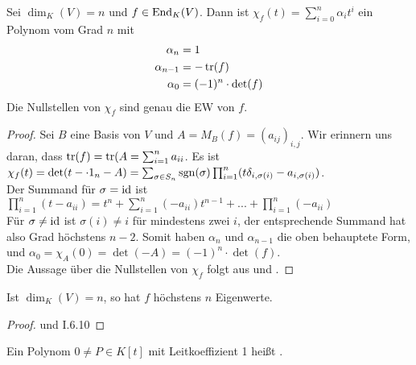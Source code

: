 \begin{proposition}
	Sei $\dim_K(V)=n$ und $f\in\operatorname{End}_K(V)$. Dann ist $\chi_f(t)=\sum_{i=0}^n \alpha_i t^i$ ein Polynom vom Grad $n$ mit 
	\begin{align}
		\alpha_n&=1\notag \\
		\alpha_{n-1}&=-\operatorname{tr}(f) \notag \\
		\alpha_0 &= (-1)^n\cdot\det(f) \notag
	\end{align}
	Die Nullstellen von $\chi_f$ sind genau die EW von $f$.
\end{proposition}
\begin{proof}
	Sei $B$ eine Basis von $V$ und $A=M_B(f)=(a_{ij})_{i,j}$. Wir erinnern uns daran, dass $\operatorname{tr}(f)=\operatorname{tr}(A=\sum_{i=1}^n a_{ii}$. Es ist $\chi_f(t)=\det(t-\cdot 1_n-A)=\sum_{\sigma\in S_n}\operatorname{sgn}(\sigma)\prod_{i=1}^n (t\delta_{i,\sigma(i)}-a_{i,\sigma(i)})$. \\
	Der Summand für \emph{$\sigma=\operatorname{id}$} ist $\prod_{i=1}^n (t-a_{ii})=t^n+\sum_{i=1}^n (-a_{ii})t^{n-1}+...+\prod_{i=1}^n(-a_{ii})$ \\
	Für \emph{$\sigma\neq\operatorname{id}$} ist $\sigma(i)\neq i$ für mindestens zwei $i$, der entsprechende Summand hat also Grad höchstens $n-2$. Somit haben $\alpha_n$ und $\alpha_{n-1}$ die oben behauptete Form, und $\alpha_0=\chi_A(0)=\det(-A)=(-1)^n\cdot\det(f)$. \\
	Die Aussage über die Nullstellen von $\chi_f$ folgt aus  und .
\end{proof}

\begin{conclusion}
	Ist $\dim_K(V)=n$, so hat $f$ höchstens $n$ Eigenwerte.
\end{conclusion}
\begin{proof}
	 und I.6.10 %
\end{proof}

\begin{definition}
	Ein Polynom $0\neq P\in K[t]$ mit Leitkoeffizient 1 heißt .
\end{definition}

